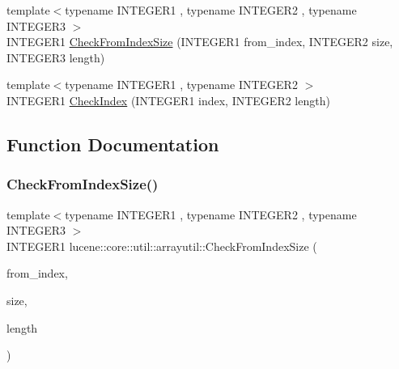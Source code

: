 \begin{DoxyCompactItemize}
\item 
{\footnotesize template$<$typename I\+N\+T\+E\+G\+E\+R1 , typename I\+N\+T\+E\+G\+E\+R2 , typename I\+N\+T\+E\+G\+E\+R3 $>$ }\\I\+N\+T\+E\+G\+E\+R1 \mbox{\hyperlink{namespacelucene_1_1core_1_1util_1_1arrayutil_a6cc8403ccdcd9a14b515bf7cb5a76ab8}{Check\+From\+Index\+Size}} (I\+N\+T\+E\+G\+E\+R1 from\+\_\+index, I\+N\+T\+E\+G\+E\+R2 size, I\+N\+T\+E\+G\+E\+R3 length)
\item 
{\footnotesize template$<$typename I\+N\+T\+E\+G\+E\+R1 , typename I\+N\+T\+E\+G\+E\+R2 $>$ }\\I\+N\+T\+E\+G\+E\+R1 \mbox{\hyperlink{namespacelucene_1_1core_1_1util_1_1arrayutil_a5ae051dbfca2d74c4956413e2a60cce7}{Check\+Index}} (I\+N\+T\+E\+G\+E\+R1 index, I\+N\+T\+E\+G\+E\+R2 length)
\end{DoxyCompactItemize}


\subsection{Function Documentation}
\mbox{\label{namespacelucene_1_1core_1_1util_1_1arrayutil_a6cc8403ccdcd9a14b515bf7cb5a76ab8}} 
\subsubsection{\texorpdfstring{Check\+From\+Index\+Size()}{CheckFromIndexSize()}}
{\footnotesize\ttfamily template$<$typename I\+N\+T\+E\+G\+E\+R1 , typename I\+N\+T\+E\+G\+E\+R2 , typename I\+N\+T\+E\+G\+E\+R3 $>$ \\
I\+N\+T\+E\+G\+E\+R1 lucene\+::core\+::util\+::arrayutil\+::\+Check\+From\+Index\+Size (\begin{DoxyParamCaption}\item[{I\+N\+T\+E\+G\+E\+R1}]{from\+\_\+index,  }\item[{I\+N\+T\+E\+G\+E\+R2}]{size,  }\item[{I\+N\+T\+E\+G\+E\+R3}]{length }\end{DoxyParamCaption})}

\mbox{\label{namespacelucene_1_1core_1_1util_1_1arrayutil_a4268c9d6e916463cb412335111220f11}} 

